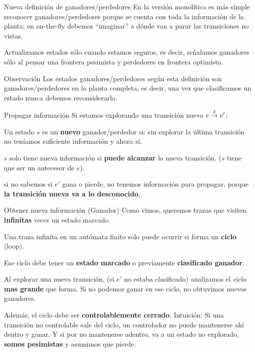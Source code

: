 \begin{frame}{Nueva definición de ganadores/perdedores}
    En la versión monolítica es más simple reconocer ganadores/perdedores porque se cuenta con toda la información de la planta; en on-the-fly debemos ``imaginar'' a dónde van a parar las transiciones no vistas.
    
    Actualizamos estados sólo cuando estamos seguros, es decir, señalamos ganadores sólo al pensar una frontera pesimista y perdedores en frontera optimista.
    
    \begin{block}{Observación}
        Los estados ganadores/perdedores según esta definición son ganadores/perdedores en la planta completa, es decir, una vez que clasificamos un estado nunca debemos reconsiderarlo.
    \end{block}
\end{frame}
\begin{frame}{Propagar información}
	Si estamos explorando una transición nueva $e \overset{\ell}{\rightarrow}_{} e'$:
	
	\pause
	
	Un estado $s$ es un \textbf{nuevo} ganador/perdedor si: sin explorar la última transición no teníamos suficiente información y ahora sí.
	
	\pause
	
	$s$ solo tiene nueva información si \textbf{puede alcanzar} la nueva transición. ($s$ tiene que ser un antecesor de $e$).
	
	\pause 
	
	si no sabemos si $e'$ gana o pierde, no tenemos información para propagar, porque \textbf{la transición nueva va a lo desconocido}.

\end{frame}
\begin{frame}{Obtener nueva información (Ganador)}
	Como vimos, queremos trazas que visiten \textbf{infinitas} veces un estado marcado.
	
	\pause
	
	Una traza infinita en un autómata finito solo puede ocurrir si forma un \textbf{ciclo} (loop).
	
	\pause
		
	Ese ciclo debe tener un \textbf{estado marcado} o previamente \textbf{clasificado ganador}.
	
	\pause
	
	Al explorar una nueva transición, (si $e'$ no estaba clasificado) analizamos el ciclo \textbf{mas grande} que forma. Si no podemos ganar en ese ciclo, no obtuvimos nuevos ganadores.
	
	\pause

	Además, el ciclo debe ser \textbf{controlablemente cerrado}. Intuición: Si una transición no controlable sale del ciclo, un controlador no puede mantenerse ahí dentro y ganar. Y si por no mantenerse adentro, va a un estado no explorado, \textbf{somos pesimistas} y asumimos que pierde.
\end{frame}
